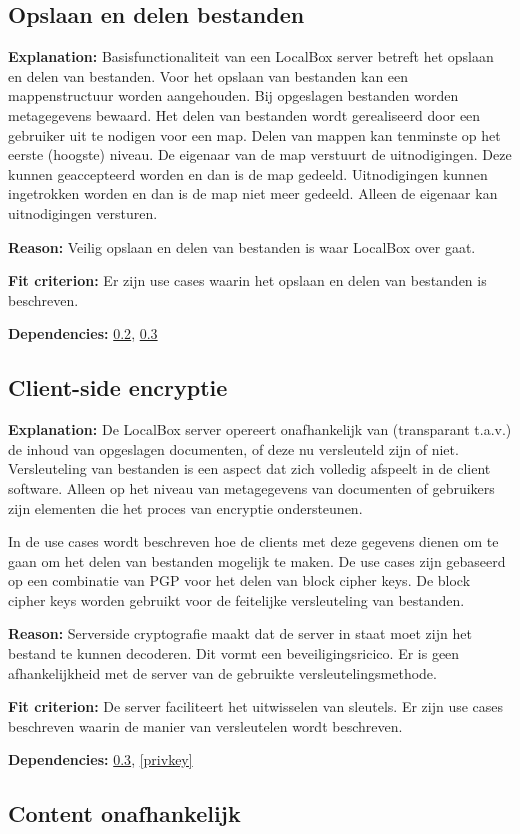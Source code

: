 \documentclass[[11pt,a4paper]{article}
\newcommand\requirement[2]{\subsection{#2}\label{#1}}
\newcommand\explanation{\noindent\textbf{Explanation: }}
\newcommand\reason{\noindent\textbf{Reason: }}
\newcommand\criterion{\noindent\textbf{Fit criterion: }}
\newcommand\dependencies{\noindent\textbf{Dependencies: }}
\begin{document}

\requirement{sharing}{Opslaan en delen bestanden}

    \explanation Basisfunctionaliteit van een LocalBox server betreft het opslaan en delen van bestanden. Voor het opslaan van bestanden kan een mappenstructuur worden aangehouden. Bij opgeslagen bestanden worden metagegevens bewaard. Het delen van bestanden wordt gerealiseerd door een gebruiker uit te nodigen voor een map. Delen van mappen kan tenminste op het eerste (hoogste) niveau. De eigenaar van de map verstuurt de uitnodigingen. Deze kunnen geaccepteerd worden en dan is de map gedeeld. Uitnodigingen kunnen ingetrokken worden en dan is de map niet meer gedeeld. Alleen de eigenaar kan uitnodigingen versturen. 

    \reason Veilig opslaan en delen van bestanden is waar LocalBox over gaat.

    \criterion Er zijn use cases waarin het opslaan en delen van bestanden is beschreven.

    \dependencies \ref{ccrypto}, \ref{blindserver}

\requirement{ccrypto}{Client-side encryptie}

    \explanation De LocalBox server opereert onafhankelijk van (transparant t.a.v.) de inhoud van opgeslagen documenten, of deze nu versleuteld zijn of niet. Versleuteling van bestanden is een aspect dat zich volledig afspeelt in de client software. Alleen op het niveau van metagegevens van documenten of gebruikers zijn elementen die het proces van encryptie ondersteunen. 

    In de use cases wordt beschreven hoe de clients met deze gegevens dienen om te gaan om het delen van bestanden mogelijk te maken. De use cases zijn gebaseerd op een combinatie van PGP voor het delen van block cipher keys. De block cipher keys worden gebruikt voor de feitelijke versleuteling van bestanden.

    \reason Serverside cryptografie maakt dat de server in staat moet zijn het bestand te kunnen decoderen. Dit vormt een beveiligingsricico. Er is geen afhankelijkheid met de server van de gebruikte versleutelingsmethode. 

    \criterion De server faciliteert het uitwisselen van sleutels. Er zijn use cases beschreven waarin de manier van versleutelen wordt beschreven.

    \dependencies \ref{blindserver}, \ref{privkey}


\requirement{blindserver}{Content onafhankelijk}
\end{document}
